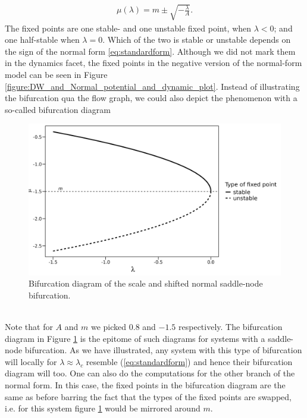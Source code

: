 \begin{align}
    \mu\left(\lambda\right) = m \pm \sqrt{-\frac{\lambda}{A}}. \label{eq:fixedPoint}
\end{align}
The fixed points are one stable- and one unstable fixed point, when $\lambda<0$; and one half-stable when $\lambda=0$. Which of the two is stable or unstable depends on the sign of the normal form \ref{eq:standardform}. Although we did not mark them in the dynamics facet, the fixed points in the negative version of the normal-form model can be seen in Figure \ref{figure:DW_and_Normal_potential_and_dynamic_plot}. Instead of illustrating the bifurcation qua the flow graph, we could also depict the phenomenon with a so-called bifurcation diagram
\begin{figure}[h]
\begin{center}
    \includegraphics[scale = .125]{figures/bifurcation_diagram.jpeg}
    \caption{Bifurcation diagram of the scale and shifted normal saddle-node bifurcation.}
    \label{figure:bifurcationDiagram}
\end{center}
\end{figure}\\
Note that for $A$ and $m$ we picked $0.8$ and $-1.5$ respectively. The bifurcation diagram in Figure \ref{figure:bifurcationDiagram} is the epitome of such diagrams for systems with a saddle-node bifurcation. As we have illustrated, any system with this type of bifurcation will locally for $\lambda \approx \lambda_c$ resemble (\ref{eq:standardform}) and hence their bifurcation diagram will too. One can also do the computations for the other branch of the normal form. In this case, the fixed points in the bifurcation diagram are the same as before barring the fact that the types of the fixed points are swapped, i.e. for this system figure \ref{figure:bifurcationDiagram} would be mirrored around $m$.
